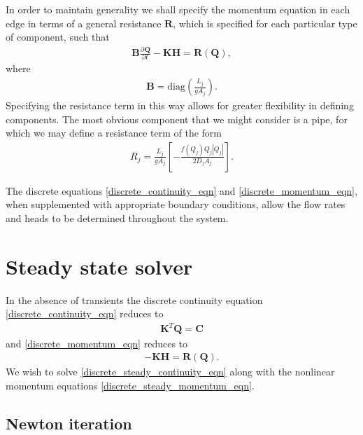 \documentclass[12pt]{article}
\newcommand{\pardiv}[3]{\frac{\partial^{#1} #2}{\partial #3^{#1}}}
\begin{document}
In order to maintain generality we shall specify the momentum equation in each edge in terms of a general resistance $\mathbf{R}$, which is specified for each particular type of component, such that 
\begin{align}\label{discrete_momentum_eqn}
\boxed{\mathbf{B} \pardiv{}{\mathbf{Q}}{t} -\mathbf{K} \mathbf{H} = \mathbf{R}(\mathbf{Q}),}
\end{align}
where \begin{align}
\mathbf{B} = \text{diag}\left( \frac{L_j}{g A_j}\right).
\end{align}
Specifying the resistance term in this way allows for greater flexibility in defining components. The most obvious component that we might consider is a pipe, for which we may define a resistance term of the form
\begin{align}\label{pipe_resistance}
\boxed{ R_j = \frac{L_j}{g A_j} \left[ - \frac{f(Q_j)Q_j|Q_j|}{2 D_j A_j} \right]. }
\end{align}

The discrete equations \eqref{discrete_continuity_eqn} and \eqref{discrete_momentum_eqn}, when supplemented with appropriate boundary conditions, allow the flow rates and heads to be determined throughout the system. 

\section{Steady state solver} \label{sec:steady_state} 

In the absence of transients the discrete continuity equation \eqref{discrete_continuity_eqn} reduces to 
\begin{align}\label{discrete_steady_continuity_eqn}
\boxed{\mathbf{K}^T \mathbf{Q} = \mathbf{C}}
\end{align} 
and \eqref{discrete_momentum_eqn} reduces to 
\begin{align}\label{discrete_steady_momentum_eqn}
\boxed{-\mathbf{K} \mathbf{H} = \mathbf{R}(\mathbf{Q}).}
\end{align}
We wish to solve \eqref{discrete_steady_continuity_eqn} along with the nonlinear momentum equations \eqref{discrete_steady_momentum_eqn}.

\subsection{Newton iteration}
\end{document}
